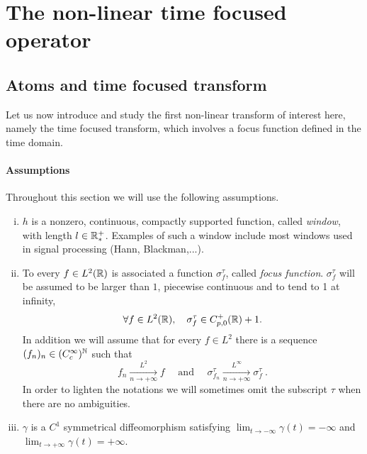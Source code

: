 \section{The non-linear time focused operator}\label{sec_time_focus}

\subsection{Atoms and time focused transform}
\label{sse:definitions.timefocus}
Let us now introduce and study the first non-linear transform of interest here, namely the time focused transform, which involves a focus function defined in the time domain. 


\paragraph{Assumptions}

Throughout this section we will use the following assumptions.

\begin{enumerate}[i.]
    \item
    $h$ is a nonzero, continuous, compactly supported function, called \textit{window}, with length $l\in\mathbb{R}^+_*$. Examples of such a window include most windows used in signal processing (Hann, Blackman,...). 
    \item
    To every $f\in L^2(\mathbb{R})$ is associated a function $\sigma_f^\tau$, called \textit{focus function}. $\sigma_f^\tau$ will be assumed to be larger than $1$, piecewise continuous and to tend to 1 at infinity, \ie
    \begin{equation}
    \forall f\in L^2(\mathbb{R}), \quad  \sigma^\tau_f \in C^+_{p,0}(\mathbb{R}) + 1.
    \end{equation}
    In addition we will assume that for every $f\in L^2$ there is a sequence $(f_n)_n\in (C_c^\infty)^{\mathbb{N}}$ such that 
    \begin{equation}\label{eq_hypothesis_cv_sigma}
    f_n \underset{n\rightarrow+\infty}{\overset{L^2}{\longrightarrow}} f \quad \text{ and } \quad \sigma_{f_n}^\tau \underset{n\rightarrow+\infty}{\overset{L^\infty}{\longrightarrow}} \sigma_f^\tau \ .
    \end{equation}
    In order to lighten the notations we will sometimes omit the subscript $\tau$ when there are no ambiguities. 
    \item $\gamma$ is a $C^1$ symmetrical diffeomorphism satisfying $\lim_{t\to -\infty}\gamma(t)=-\infty$  and $\lim_{t\to +\infty}\gamma(t)=+\infty$. 
\end{enumerate}


